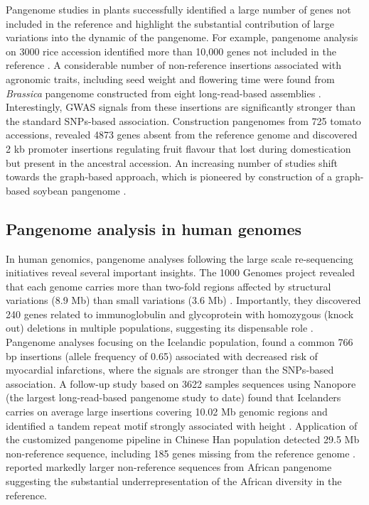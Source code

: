 \documentclass[../main.tex]{subfiles}
\begin{document}
Pangenome studies in plants successfully identified a large number of genes not included in the reference and highlight the substantial contribution of large variations into the dynamic of the pangenome. For example, pangenome analysis on 3000 rice accession identified more than 10,000 genes not included in the reference \citep{wang2018genomic}. A considerable number of non-reference insertions associated with agronomic traits, including seed weight and flowering time were found from \emph{Brassica} pangenome constructed from eight long-read-based assemblies \citep{song2020eight}. Interestingly, GWAS signals from these insertions are significantly stronger than the standard SNPs-based association. Construction pangenomes from 725 tomato accessions, \citet{gao2019tomato} revealed 4873 genes absent from the reference genome and discovered 2 kb promoter insertions regulating fruit flavour that lost during domestication but present in the ancestral accession. An increasing number of studies shift towards the graph-based approach, which is pioneered by construction of a graph-based soybean pangenome \citep{liu2020pan}. 

\subsection{Pangenome analysis in human genomes}

In human genomics, pangenome analyses following the large scale re-sequencing initiatives reveal several important insights. The 1000 Genomes project  revealed that each genome carries more than two-fold regions affected by structural variations (8.9 Mb) than small variations (3.6 Mb) \citep{10002015global}. Importantly, they discovered 240 genes related to immunoglobulin and glycoprotein with homozygous (knock out) deletions in multiple populations, suggesting its dispensable role \citep{sudmant2015integrated}. Pangenome analyses focusing on the Icelandic population, \citep{kehr2017diversity} found a common 766 bp insertions (allele frequency of 0.65) associated with decreased risk of myocardial infarctions, where the signals are stronger than the SNPs-based association. A follow-up study based on 3622 samples sequences using Nanopore (the largest long-read-based pangenome study to date) found that Icelanders carries on average large insertions covering 10.02 Mb genomic regions and identified a tandem repeat motif strongly associated with height \citep{beyter2020long}. Application of the customized pangenome pipeline in Chinese Han population detected 29.5 Mb non-reference sequence, including 185 genes missing from the reference genome \citep{duan2019hupan}. \citet{sherman2020pan} reported markedly larger non-reference sequences from African pangenome suggesting the substantial underrepresentation of the African diversity in the reference.
\end{document}
